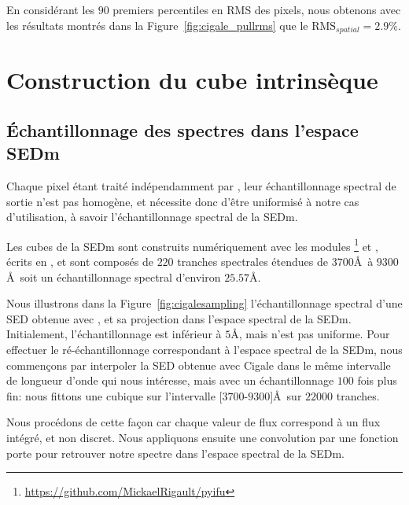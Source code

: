 \documentclass[../main/main.tex]{subfiles}
\begin{document}
En considérant les $90$ premiers percentiles en RMS des pixels, nous obtenons avec les résultats montrés dans la
Figure~\ref{fig:cigale_pullrms} que le $\text{RMS}_{spatial}=2.9\%$.

\section{Construction du cube intrinsèque}\label{sec:intcube}

\subsection{\'Echantillonnage des spectres dans l'espace SEDm}

Chaque pixel étant traité indépendamment par \cigale, leur échantillonnage
spectral de sortie n'est pas homogène, et nécessite donc d'être uniformisé à
notre cas d'utilisation, à savoir l'échantillonnage spectral de la SEDm.

Les cubes de la SEDm sont construits numériquement avec les modules
\footnote{\url{https://github.com/MickaelRigault/pyifu}} et
, écrits en , et sont composés de $220$ tranches spectrales
étendues de $3700$\AA\ à $9300$\AA\, soit un échantillonnage spectral
d'environ $25.57$\AA.

Nous illustrons dans la Figure~\ref{fig:cigalesampling}
l'échantillonnage spectral d'une SED obtenue avec \cigale, et sa
projection dans l'espace spectral de la SEDm.
Initialement, l'échantillonnage est inférieur à
$5$\AA, mais n'est pas uniforme. Pour effectuer le ré-échantillonnage
correspondant à l'espace spectral de la SEDm, nous commençons par
interpoler la SED obtenue avec Cigale dans le même intervalle de
longueur d'onde qui nous intéresse, mais avec un échantillonnage $100$
fois plus fin: nous fittons une cubique sur l'intervalle
[$3700$-$9300$]\AA\ sur $22000$ tranches.

Nous procédons de cette façon car chaque valeur de flux correspond à un
flux intégré, et non discret. 
Nous appliquons ensuite une convolution par une fonction porte pour
retrouver notre spectre dans l'espace spectral de la SEDm. 
\end{document}
